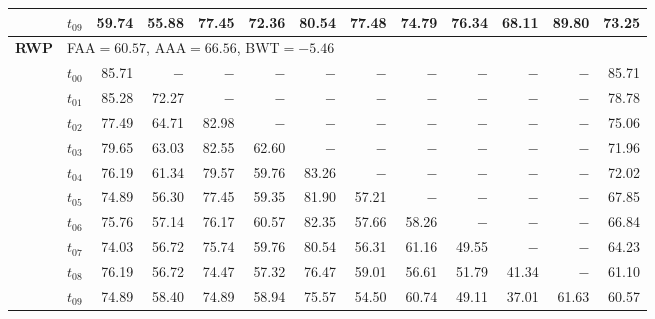 \begin{table}[ht]
\begin{tabular}{@{}l l r r r r r r r r r r r@{}}
 & $t_{09}$ & 59.74 & 55.88 & 77.45 & 72.36 & 80.54 & 77.48 & 74.79 & 76.34 & 68.11 & 89.80 & 73.25 \\
\midrule
\multirow{11}{*}{\textbf{RWP}} & \multicolumn{12}{l}{\quad\small FAA$=60.57$,\; AAA$=66.56$,\; BWT$=-5.46$} \\
 & $t_{00}$ & 85.71 & $-$ & $-$ & $-$ & $-$ & $-$ & $-$ & $-$ & $-$ & $-$ & 85.71 \\
 & $t_{01}$ & 85.28 & 72.27 & $-$ & $-$ & $-$ & $-$ & $-$ & $-$ & $-$ & $-$ & 78.78 \\
 & $t_{02}$ & 77.49 & 64.71 & 82.98 & $-$ & $-$ & $-$ & $-$ & $-$ & $-$ & $-$ & 75.06 \\
 & $t_{03}$ & 79.65 & 63.03 & 82.55 & 62.60 & $-$ & $-$ & $-$ & $-$ & $-$ & $-$ & 71.96 \\
 & $t_{04}$ & 76.19 & 61.34 & 79.57 & 59.76 & 83.26 & $-$ & $-$ & $-$ & $-$ & $-$ & 72.02 \\
 & $t_{05}$ & 74.89 & 56.30 & 77.45 & 59.35 & 81.90 & 57.21 & $-$ & $-$ & $-$ & $-$ & 67.85 \\
 & $t_{06}$ & 75.76 & 57.14 & 76.17 & 60.57 & 82.35 & 57.66 & 58.26 & $-$ & $-$ & $-$ & 66.84 \\
 & $t_{07}$ & 74.03 & 56.72 & 75.74 & 59.76 & 80.54 & 56.31 & 61.16 & 49.55 & $-$ & $-$ & 64.23 \\
 & $t_{08}$ & 76.19 & 56.72 & 74.47 & 57.32 & 76.47 & 59.01 & 56.61 & 51.79 & 41.34 & $-$ & 61.10 \\
 & $t_{09}$ & 74.89 & 58.40 & 74.89 & 58.94 & 75.57 & 54.50 & 60.74 & 49.11 & 37.01 & 61.63 & 60.57 \\
\bottomrule
\end{tabular}
\end{table}

